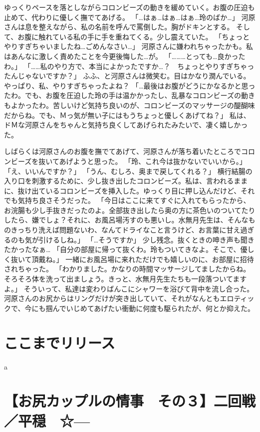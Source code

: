 ゆっくりペースを落としながらコロンビーズの動きを緩めていく。お腹の圧迫も止めて、代わりに優しく撫でてあげる。
「…はぁ…はぁ…はぁ…玲のばか…」
河原さんは息を整えながら、私の名前を呼んで罵倒した。胸がドキンとする。
そして、お腹に触れている私の手に手を重ねてくる。少し震えていた。
「ちょっとやりすぎちゃいましたね…ごめんなさい…」
河原さんに嫌われちゃったかも。私はあんなに激しく責めたことを今更後悔した…が。
「………とっても…良かったわ。」
「……私のやり方で、本当によかったですか…？　ちょっとやりすぎちゃったんじゃないですか？」
ふふ、と河原さんは微笑む。目はかなり潤んでいる。やっぱり、私、やりすぎちゃったよね？
「…最後はお腹がどうにかなるかと思ったわ。でも、お腹を圧迫した玲の手は温かかったし、乱暴なコロンビーズの動きもよかったわ。苦しいけど気持ち良いのが、コロンビーズのマッサージの醍醐味だからね。でも、Ｍっ気が無い子にはもうちょっと優しくあげてね？」
私は、ドＭな河原さんをちゃんと気持ち良くしてあげられたみたいで、凄く嬉しかった。


しばらくは河原さんのお腹を撫でてあげて、河原さんが落ち着いたところでコロンビーズを抜いてあげようと思った。
「玲、これ今は抜かないでいいから。」
「え、いいんですか？」
「うん、むしろ、奥まで戻してくれる？」
横行結腸の入り口を刺激するために、少し抜き出したコロンビーズ。私は、言われるままに、抜け出ているコロンビーズを挿入した。ゆっくり目に押し込んだけど、それでも気持ち良さそうだった。
「今日はここに来てすぐに入れてもらったから、お浣腸も少し手抜きだったのよ。全部抜き出したら奥の方に茶色いのついてたりしたら、嫌でしょ？それに、お風呂場汚すのも悪いし。水無月先生は、そんなものきっちり洗えば問題ないわ、なんてドライなこと言うけど、お言葉に甘え過ぎるのも気が引けるしね。」
「…そうですか」
少し残念。抜くときの呻き声も聞きたかったなぁ…
「自分の部屋に帰って抜くわ。玲もついてきなよ。そこで、優しく抜いて頂戴ね。」
一緒にお風呂場に来れただけでも嬉しいのに、お部屋に招待されちゃった。
「わかりました。かなりの時間マッサージしてましたからね。そろそろ体を洗って出ましょう。きっと、水無月先生たちも一段落ついてますよ。」
そういって、私達は変わりばんこにシャワーを浴びて背中を流し合った。河原さんのお尻からはリングだけが突き出していて、それがなんともエロティックで、今にも掴んでいじめてあげたい衝動に何度も駆られたが、何とか抑えた。


\section{ここまでリリース}
a

\section{【お尻カップルの情事　その３】二回戦／平穏　☆---}


